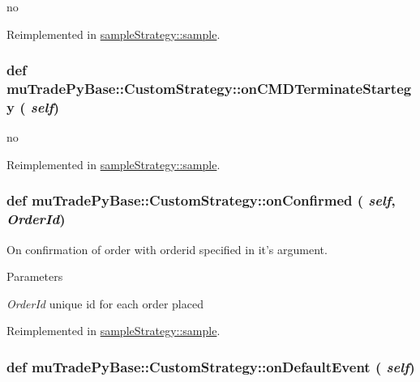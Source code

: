 no 

Reimplemented in \hyperlink{classsampleStrategy_1_1sample_add6cff726b92c0b035ffe094989b5dbb}{sampleStrategy::sample}.\hypertarget{classmuTradePyBase_1_1CustomStrategy_aeb2e0e2196645380512c59f9752efb5e}{
\subsubsection[{onCMDTerminateStartegy}]{\setlength{\rightskip}{0pt plus 5cm}def muTradePyBase::CustomStrategy::onCMDTerminateStartegy ( {\em self})}}
\label{classmuTradePyBase_1_1CustomStrategy_aeb2e0e2196645380512c59f9752efb5e}


no 

Reimplemented in \hyperlink{classsampleStrategy_1_1sample_aae075263f0648af98b9222b1f099bda0}{sampleStrategy::sample}.\hypertarget{classmuTradePyBase_1_1CustomStrategy_a2d99ec0bbe867655ed7f9373812d7a56}{
\subsubsection[{onConfirmed}]{\setlength{\rightskip}{0pt plus 5cm}def muTradePyBase::CustomStrategy::onConfirmed ( {\em self}, \/   {\em OrderId})}}
\label{classmuTradePyBase_1_1CustomStrategy_a2d99ec0bbe867655ed7f9373812d7a56}


On confirmation of order with orderid specified in it's argument. 
\begin{DoxyParams}{Parameters}
\item[{\em OrderId}]unique id for each order placed \end{DoxyParams}


Reimplemented in \hyperlink{classsampleStrategy_1_1sample_a0f8cc6ff13892e5a0c15abc506de2d24}{sampleStrategy::sample}.\hypertarget{classmuTradePyBase_1_1CustomStrategy_a30611f9dbe54a60219fcb95605004eaa}{
\subsubsection[{onDefaultEvent}]{\setlength{\rightskip}{0pt plus 5cm}def muTradePyBase::CustomStrategy::onDefaultEvent ( {\em self})}}
\label{classmuTradePyBase_1_1CustomStrategy_a30611f9dbe54a60219fcb95605004eaa}


